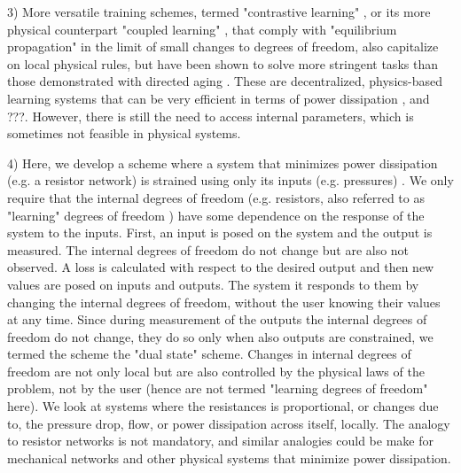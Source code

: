 \documentclass[%
 reprint,
 amsmath,amssymb,
 aps,
]{revtex4-2}
\begin{document}
    3) More versatile training schemes, termed "contrastive learning" \cite{scellier2017equilibrium}, or its more physical counterpart "coupled learning" \cite{stern2021supervised}, that comply with "equilibrium propagation" \cite{scellier2021deeplearningtheoryneural} in the limit of small changes to degrees of freedom, also capitalize on local physical rules, but have been shown to solve more stringent tasks than those demonstrated with directed aging \cite{dillavou2022demonstration, altman2024experimental}. 
    These are decentralized, physics-based learning systems that can be very efficient in terms of power dissipation \cite{stern2024training}, and \textcolor{roie}{???}. However, there is still the need to access internal parameters, which is sometimes not feasible in physical systems.

    4) Here, we develop a scheme where a system that minimizes power dissipation (e.g. a resistor network) is strained using only its inputs (e.g. pressures) \cite{gold2019self, kedia2019drive}. We only require that the internal degrees of freedom (e.g. resistors, also referred to as "learning" degrees of freedom \cite{dillavou2022demonstration}) have some dependence on the response of the system to the inputs. 
    First, an input is posed on the system and the output is measured. The internal degrees of freedom do not change but are also not observed. 
    A loss is calculated with respect to the desired output and then new values are posed on inputs and outputs. The system it responds to them by changing the internal degrees of freedom, without the user knowing their values at any time. 
    Since during measurement of the outputs the internal degrees of freedom do not change, they do so only when also outputs are constrained, we termed the scheme the "dual state" scheme. 
    Changes in internal degrees of freedom are not only local but are also controlled by the physical laws of the problem, not by the user (hence are not termed "learning degrees of freedom" here). 
    We look at systems where the resistances is proportional, or changes due to, the pressure drop, flow, or power dissipation across itself, locally. 
    The analogy to resistor networks is not mandatory, and similar analogies could be make for mechanical networks and other physical systems that minimize power dissipation.
\end{document}

